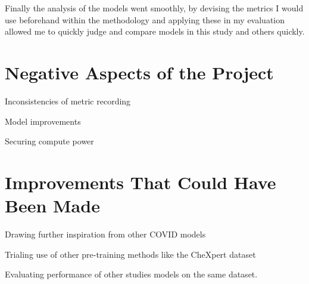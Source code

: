 Finally the analysis of the models went smoothly, by devising the metrics I would use beforehand within the methodology and applying these in my evaluation allowed me to quickly judge and compare models in this study and others quickly. 

\section{Negative Aspects of the Project}
Inconsistencies of metric recording

Model improvements

Securing compute power

\section{Improvements That Could Have Been Made}
Drawing further inspiration from other COVID models

Trialing use of other pre-training methods like the CheXpert dataset

Evaluating performance of other studies models on the same dataset.